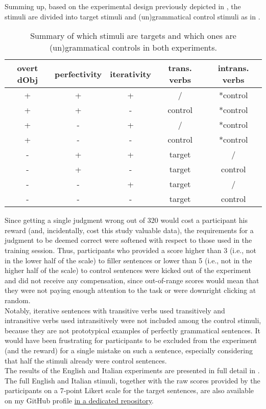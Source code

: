 Summing up, based on the experimental design previously depicted in , the stimuli are divided into target stimuli and (un)grammatical control stimuli as in .

\begin{table}[htb] %
\caption{Summary of which stimuli are targets and which ones are (un)grammatical controls in both experiments.}
\begin{tabular}{ccc|cc}
overt dObj & perfectivity & iterativity & trans. verbs & intrans. verbs \\
\hline
+          & +            & + & / & *control           \\
+          & +            & - & control & *control         \\
+          & -            & + & / & *control           \\
+          & -            & - & control & *control        \\
\hline
-          & +            & + & target & /          \\
-          & +            & - & target & control          \\
-          & -            & + & target & /          \\
-          & -            & - & target & control          
\end{tabular}
\end{table}

Since getting a single judgment wrong out of 320 would cost a participant his reward (and, incidentally, cost this study valuable data), the requirements for a judgment to be deemed correct were softened with respect to those used in the training session. Thus, participants who provided a score higher than 3 (i.e., not in the lower half of the scale) to filler sentences or lower than 5 (i.e., not in the higher half of the scale) to control sentences were kicked out of the experiment and did not receive any compensation, since out-of-range scores would mean that they were not paying enough attention to the task or were downright clicking at random.\\ Notably, iterative sentences with transitive verbs used transitively and intransitive verbs used intransitively were not included among the control stimuli, because they are not prototypical examples of perfectly grammatical sentences. It would have been frustrating for participants to be excluded from the experiment (and the reward) for a single mistake on such a sentence, especially considering that half the stimuli already were control sentences.\\
The results of the English and Italian experiments are presented in full detail in . The full English and Italian stimuli, together with the raw scores provided by the participants on a 7-point Likert scale for the target sentences, are also available on my GitHub profile \href{https://github.com/giuliacappelli/dissertationData}{in a dedicated repository}.
